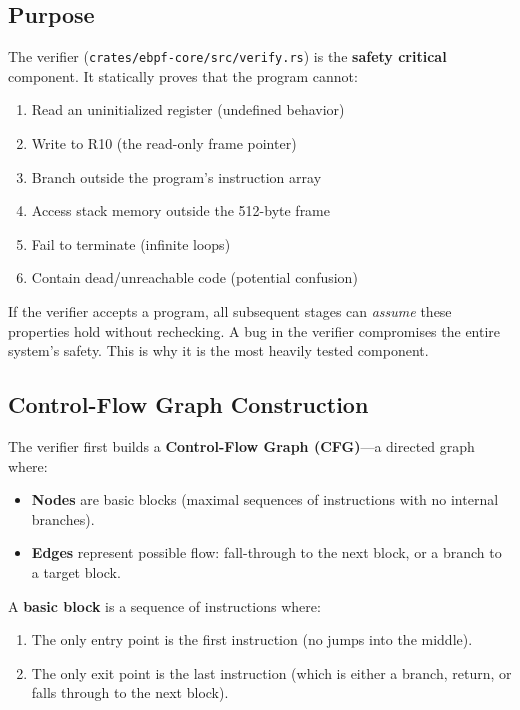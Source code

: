 \documentclass[11pt,letterpaper]{article}
\begin{document}
\subsection{Purpose}

The verifier (\texttt{crates/ebpf-core/src/verify.rs}) is the \textbf{safety critical} component. It statically proves that the program cannot:
\begin{enumerate}
    \item Read an uninitialized register (undefined behavior)
    \item Write to R10 (the read-only frame pointer)
    \item Branch outside the program's instruction array
    \item Access stack memory outside the 512-byte frame
    \item Fail to terminate (infinite loops)
    \item Contain dead/unreachable code (potential confusion)
\end{enumerate}

\begin{warning}
If the verifier accepts a program, all subsequent stages can \emph{assume} these properties hold without rechecking. A bug in the verifier compromises the entire system's safety. This is why it is the most heavily tested component.
\end{warning}

\subsection{Control-Flow Graph Construction}

The verifier first builds a \textbf{Control-Flow Graph (CFG)}---a directed graph where:
\begin{itemize}
    \item \textbf{Nodes} are basic blocks (maximal sequences of instructions with no internal branches).
    \item \textbf{Edges} represent possible flow: fall-through to the next block, or a branch to a target block.
\end{itemize}

\begin{definition}
A \textbf{basic block} is a sequence of instructions where:
\begin{enumerate}
    \item The only entry point is the first instruction (no jumps into the middle).
    \item The only exit point is the last instruction (which is either a branch, return, or falls through to the next block).
\end{enumerate}
\end{definition}
\end{document}
